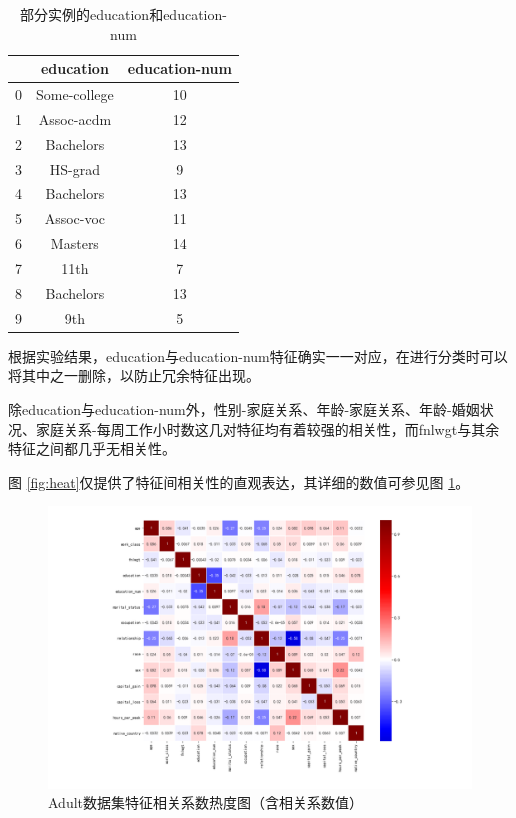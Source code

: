 \documentclass[12pt,a4paper]{article}
\theoremstyle{definition}
\begin{document}
{\begin{table}[H]
	\renewcommand\arraystretch{1.35}
	\caption{部分实例的education和education-num}
	\label{tab:guess}
	\centering
	
	\begin{tabular}{c||c|c}
		\centering
		 & education & education-num \\
		\hline
		\hline
		
		0 & Some-college & 10 \\
		1 & Assoc-acdm & 12 \\
		2 & Bachelors & 13 \\
		3 & HS-grad & 9 \\
		4 & Bachelors & 13 \\
		5 & Assoc-voc & 11 \\
		6 & Masters & 14 \\
		7 & 11th & 7 \\
		8 & Bachelors & 13 \\
		9 & 9th & 5 \\

	\end{tabular}
\end{table}

根据实验结果，education与education-num特征确实一一对应，在进行分类时可以将其中之一删除，以防止冗余特征出现。

\vspace{0.01\linewidth}
除education与education-num外，性别-家庭关系、年龄-家庭关系、年龄-婚姻状况、家庭关系-每周工作小时数这几对特征均有着较强的相关性，而fnlwgt与其余特征之间都几乎无相关性。

\vspace{0.01\linewidth}
图 \ref{fig:heat}仅提供了特征间相关性的直观表达，其详细的数值可参见图 \ref{fig:heat2}。

\begin{figure}[H]
	\centering
	\includegraphics[width=0.85\linewidth]{img/cof_heat_anno.png}
	\caption{Adult数据集特征相关系数热度图（含相关系数值）}
	\label{fig:heat2}
\end{figure}

}
\end{document}

